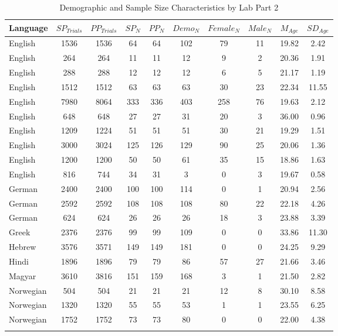\documentclass[
  man,floatsintext]{apa7}
\begin{document}
\newpage

\begin{table}[tbp]

\begin{center}
\begin{threeparttable}

\caption{\label{tab:print-part2}Demographic and Sample Size Characteristics by Lab Part 2}

\footnotesize{

\begin{tabular}{lccccccccc}
\toprule
Language & $SP_{Trials}$ & $PP_{Trials}$ & $SP_N$ & $PP_N$ & $Demo_N$ & $Female_N$ & $Male_N$ & $M_{Age}$ & $SD_{Age}$\\
\midrule
English & 1536 & 1536 & 64 & 64 & 102 & 79 & 11 & 19.82 & 2.42\\
English & 264 & 264 & 11 & 11 & 12 & 9 & 2 & 20.36 & 1.91\\
English & 288 & 288 & 12 & 12 & 12 & 6 & 5 & 21.17 & 1.19\\
English & 1512 & 1512 & 63 & 63 & 63 & 30 & 23 & 22.34 & 11.55\\
English & 7980 & 8064 & 333 & 336 & 403 & 258 & 76 & 19.63 & 2.12\\
English & 648 & 648 & 27 & 27 & 31 & 20 & 3 & 36.00 & 0.96\\
English & 1209 & 1224 & 51 & 51 & 51 & 30 & 21 & 19.29 & 1.51\\
English & 3000 & 3024 & 125 & 126 & 129 & 90 & 25 & 20.06 & 1.36\\
English & 1200 & 1200 & 50 & 50 & 61 & 35 & 15 & 18.86 & 1.63\\
English & 816 & 744 & 34 & 31 & 3 & 0 & 3 & 19.67 & 0.58\\
German & 2400 & 2400 & 100 & 100 & 114 & 0 & 1 & 20.94 & 2.56\\
German & 2592 & 2592 & 108 & 108 & 108 & 80 & 22 & 22.18 & 4.26\\
German & 624 & 624 & 26 & 26 & 26 & 18 & 3 & 23.88 & 3.39\\
Greek & 2376 & 2376 & 99 & 99 & 109 & 0 & 0 & 33.86 & 11.30\\
Hebrew & 3576 & 3571 & 149 & 149 & 181 & 0 & 0 & 24.25 & 9.29\\
Hindi & 1896 & 1896 & 79 & 79 & 86 & 57 & 27 & 21.66 & 3.46\\
Magyar & 3610 & 3816 & 151 & 159 & 168 & 3 & 1 & 21.50 & 2.82\\
Norwegian & 504 & 504 & 21 & 21 & 21 & 12 & 8 & 30.10 & 8.58\\
Norwegian & 1320 & 1320 & 55 & 55 & 53 & 1 & 1 & 23.55 & 6.25\\
Norwegian & 1752 & 1752 & 73 & 73 & 80 & 0 & 0 & 22.00 & 4.38\\
\bottomrule
\addlinespace
\end{tabular}

}
\end{threeparttable}
\end{center}
\end{table}
\end{document}
